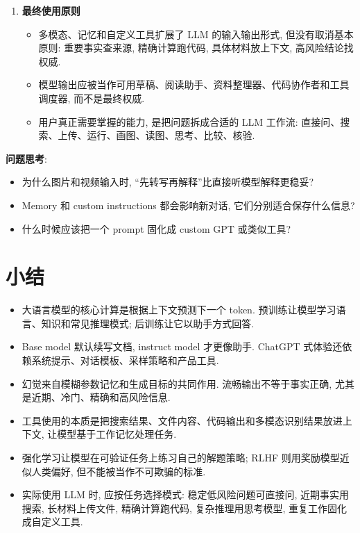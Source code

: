 \documentclass{../nndlcourse}
\begin{document}
\begin{enumerate}
\begin{itemize}
      \item 它适合高频重复任务. 例如英文数学术语卡片生成器、论文段落翻译器、板书 OCR 到 LaTeX 工具、错题拆解助手、代码审查清单和固定格式摘要器.
      \item 设计自定义 GPT 时, 不只要描述任务, 还要给少量输入输出示例. Few-shot prompt 能帮助模型理解格式边界、颗粒度和判断标准.
      \item 对长示例, 可以使用清晰的标签分隔输入和理想输出. 这和教学生类似: 只讲规则不如给例子, 给例子还要让边界清楚.
    \end{itemize}
  \item \textbf{最终使用原则}
    \begin{itemize}
      \item 多模态、记忆和自定义工具扩展了 LLM 的输入输出形式, 但没有取消基本原则: 重要事实查来源, 精确计算跑代码, 具体材料放上下文, 高风险结论找权威.
      \item 模型输出应被当作可用草稿、阅读助手、资料整理器、代码协作者和工具调度器, 而不是最终权威.
      \item 用户真正需要掌握的能力, 是把问题拆成合适的 LLM 工作流: 直接问、搜索、上传、运行、画图、读图、思考、比较、核验.
    \end{itemize}
\end{enumerate}

\textbf{问题思考}:
\begin{itemize}
  \item 为什么图片和视频输入时, “先转写再解释”比直接听模型解释更稳妥?
  \item Memory 和 custom instructions 都会影响新对话, 它们分别适合保存什么信息?
  \item 什么时候应该把一个 prompt 固化成 custom GPT 或类似工具?
\end{itemize}

\section{小结}

\begin{itemize}
  \item 大语言模型的核心计算是根据上下文预测下一个 token. 预训练让模型学习语言、知识和常见推理模式; 后训练让它以助手方式回答.
  \item Base model 默认续写文档, instruct model 才更像助手. ChatGPT 式体验还依赖系统提示、对话模板、采样策略和产品工具.
  \item 幻觉来自模糊参数记忆和生成目标的共同作用. 流畅输出不等于事实正确, 尤其是近期、冷门、精确和高风险信息.
  \item 工具使用的本质是把搜索结果、文件内容、代码输出和多模态识别结果放进上下文, 让模型基于工作记忆处理任务.
  \item 强化学习让模型在可验证任务上练习自己的解题策略; RLHF 则用奖励模型近似人类偏好, 但不能被当作不可欺骗的标准.
  \item 实际使用 LLM 时, 应按任务选择模式: 稳定低风险问题可直接问, 近期事实用搜索, 长材料上传文件, 精确计算跑代码, 复杂推理用思考模型, 重复工作固化成自定义工具.
\end{itemize}
\end{document}
